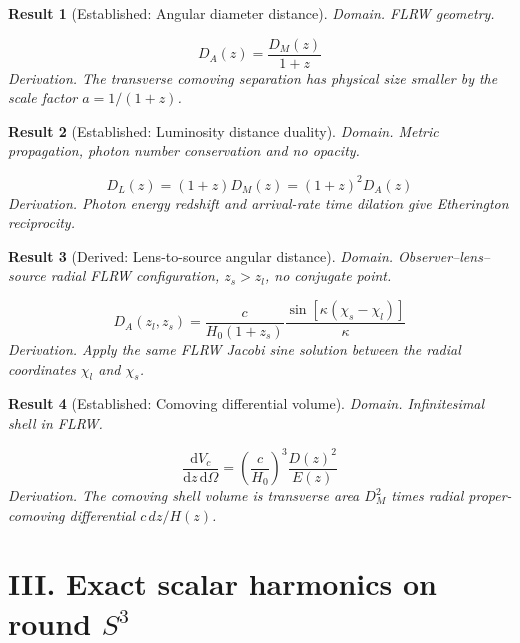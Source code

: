 \documentclass[aps,prd,onecolumn,notitlepage,groupedaddress,11pt]{revtex4-2}
\newtheorem{result}{Result}
\begin{document}
\begin{result}[\textsf{Established}: Angular diameter distance]\label{res:9}
\textit{Domain.} FLRW geometry.\par
\begin{equation}\label{eq:9}
D_A(z)=\frac{D_M(z)}{1+z}
\end{equation}
\textit{Derivation.} The transverse comoving separation has physical size smaller by the scale factor $a=1/(1+z)$.
\end{result}

\begin{result}[\textsf{Established}: Luminosity distance duality]\label{res:10}
\textit{Domain.} Metric propagation, photon number conservation and no opacity.\par
\begin{equation}\label{eq:10}
D_L(z)=(1+z)D_M(z)=(1+z)^2D_A(z)
\end{equation}
\textit{Derivation.} Photon energy redshift and arrival-rate time dilation give Etherington reciprocity.
\end{result}

\begin{result}[\textsf{Derived}: Lens-to-source angular distance]\label{res:11}
\textit{Domain.} Observer--lens--source radial FLRW configuration, $z_s>z_l$, no conjugate point.\par
\begin{equation}\label{eq:11}
D_A(z_l,z_s)=\frac{c}{H_0(1+z_s)}\frac{\sin[\kappa(\chi_s-\chi_l)]}{\kappa}
\end{equation}
\textit{Derivation.} Apply the same FLRW Jacobi sine solution between the radial coordinates $\chi_l$ and $\chi_s$.
\end{result}

\begin{result}[\textsf{Established}: Comoving differential volume]\label{res:12}
\textit{Domain.} Infinitesimal shell in FLRW.\par
\begin{equation}\label{eq:12}
\frac{\mathrm dV_c}{\mathrm dz\,\mathrm d\Omega}=\left(\frac{c}{H_0}\right)^3\frac{D(z)^2}{E(z)}
\end{equation}
\textit{Derivation.} The comoving shell volume is transverse area $D_M^2$ times radial proper-comoving differential $c\,dz/H(z)$.
\end{result}

\section{III. Exact scalar harmonics on round $S^3$}
\end{document}
